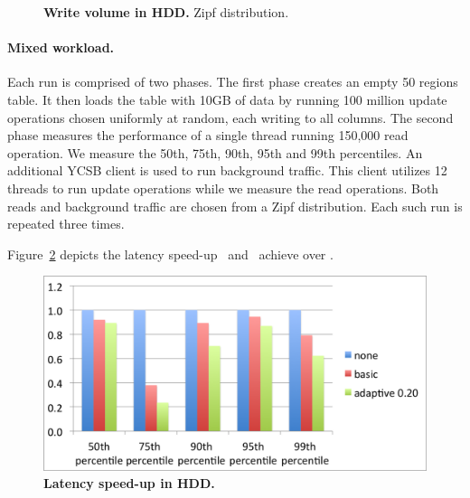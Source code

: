 {\begin{figure}[htb]
\caption{{\bf  Write volume in HDD.} Zipf distribution.
}
\label{fig:volume-hdd-uniform}
\end{figure}



\paragraph{Mixed workload.}
Each run is comprised of two phases. 
The first phase creates an empty 50 regions table. It then loads the table with 10GB of data by running 100 million update operations chosen uniformly at random, each writing to all columns. 
The second phase measures the performance of a single thread running 150,000 read operation. 
We measure the 50th, 75th, 90th, 95th and 99th percentiles.
An additional YCSB client is used to run background traffic. 
This client utilizes 12 threads to run update operations while we measure the read operations. 
Both reads and background traffic are chosen from a Zipf distribution.
Each such run is repeated three times. 

Figure~\ref{fig:latency-speedup-hdd} depicts the latency speed-up \basic\ and \magic\ achieve over \none.

\begin{figure}[htb]
\includegraphics[width=\figw]{Figs/latency-speedup-hdd.png}
\caption{{\bf Latency speed-up in HDD.} 
}
\label{fig:latency-speedup-hdd}
\end{figure}
}

